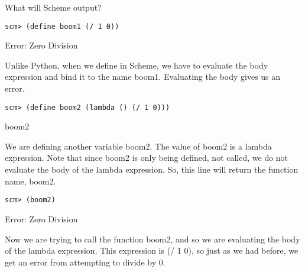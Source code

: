 \begin{blocksection}
\question What will Scheme output?

\begin{lstlisting}
scm> (define boom1 (/ 1 0))
\end{lstlisting}
\begin{solution}[0.25in]
Error: Zero Division

Unlike Python, when we define in Scheme, we have to evaluate the body expression and bind it to the name boom1. Evaluating the body gives us an error.
\end{solution}

\begin{lstlisting}
scm> (define boom2 (lambda () (/ 1 0)))
\end{lstlisting}
\begin{solution}[0.25in]
boom2

We are defining another variable boom2. The value of boom2 is a lambda expression. Note that since boom2 is only being defined, not called, we do not evaluate the body of the lambda expression. So, this line will return the function name, boom2.
\end{solution}

\begin{lstlisting}
scm> (boom2)
\end{lstlisting}
\begin{solution}[0.25in]
Error: Zero Division

Now we are trying to call the function boom2, and so we are evaluating the body of the lambda expression. This expression is (/ 1 0), so just as we had before, we get an error from attempting to divide by 0.
\end{solution}

\end{blocksection}